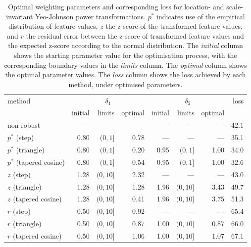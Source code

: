 \documentclass[
  a4paper,
]{article}
\begin{document}
\begin{table}
\begin{center}
\caption{Optimal weighting parameters and corresponding loss for location- and scale-invariant Yeo-Johnson power transformations.
$p^{*}$ indicates use of the empirical distribution of feature values, $z$ the z-score of the transformed feature values,
and $r$ the residual error between the z-score of transformed feature values and the expected z-score according to the normal distribution. 
The \textit{initial} column shows the starting parameter value for the optimisation process, with the corresponding boundary values in the \textit{limits} column.
The \textit{optimal} column shows the optimal parameter values. 
The \textit{loss} column shows the loss achieved by each method, under optimised parameters.}
\label{tab:optimal-weighting-parameters-yeo-johnson}
\begin{tabular}{l r r r r r r r}

\toprule
method & \multicolumn{3}{c}{$\delta_1$} & \multicolumn{3}{c}{$\delta_2$} & loss \\
& initial & limits & optimal & initial & limits & optimal & \\

\midrule
non-robust               & ---  & ---       & ---  & ---  & ---       & ---  & 42.1 \\
$p^{*}$ (step)           & 0.80 & $(0, 1]$  & 0.78 & ---  & ---       & ---  & 35.1 \\
$p^{*}$ (triangle)       & 0.80 & $(0, 1]$  & 0.20 & 0.95 & $(0, 1]$  & 1.00 & 34.0 \\
$p^{*}$ (tapered cosine) & 0.80 & $(0, 1]$  & 0.54 & 0.95 & $(0, 1]$  & 1.00 & 32.6 \\
$z$ (step)               & 1.28 & $(0, 10]$ & 2.32 & ---  & ---       & ---  & 43.0 \\
$z$ (triangle)           & 1.28 & $(0, 10]$ & 1.28 & 1.96 & $(0, 10]$ & 3.43 & 49.7 \\
$z$ (tapered cosine)     & 1.28 & $(0, 10]$ & 0.41 & 1.96 & $(0, 10]$ & 3.75 & 51.3 \\
$r$ (step)               & 0.50 & $(0, 10]$ & 0.92 & ---  & ---       & ---  & 65.4 \\
$r$ (triangle)           & 0.50 & $(0, 10]$ & 0.87 & 1.00 & $(0, 10]$ & 0.87 & 66.0 \\
$r$ (tapered cosine)     & 0.50 & $(0, 10]$ & 1.06 & 1.00 & $(0, 10]$ & 1.07 & 67.1 \\
\bottomrule
\end{tabular}
\end{center}
\end{table}
\end{document}
